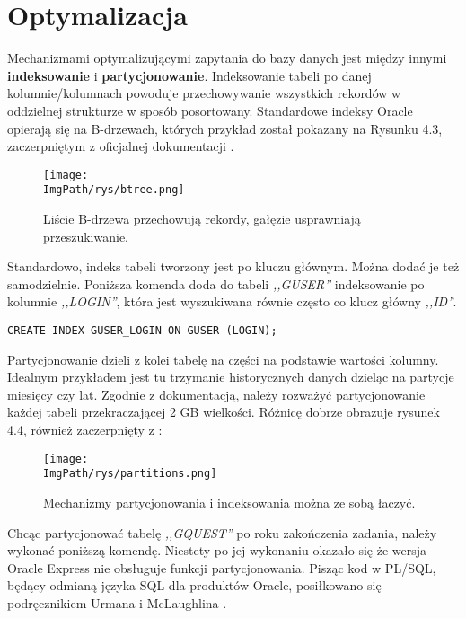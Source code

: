\documentclass[a4paper,12pt,twoside,openany]{report}
\newcommand{\ImgPath}{.}
\begin{document}
\section{Optymalizacja}
Mechanizmami optymalizującymi zapytania do bazy danych jest między innymi \textbf{indeksowanie} i \textbf{partycjonowanie}. Indeksowanie tabeli po danej kolumnie/kolumnach powoduje przechowywanie wszystkich rekordów w oddzielnej strukturze w sposób posortowany. Standardowe indeksy Oracle opierają się na B-drzewach, których przykład został pokazany na Rysunku 4.3, zaczerpniętym z oficjalnej dokumentacji \cite{Oracle2}.
				\begin{figure}[!htbp]
					\begin{center}
						\centering
						\texttt{[image: \\ImgPath/rys/btree.png]}
					\end{center}
					\caption{Liście B-drzewa przechowują rekordy, gałęzie usprawniają przeszukiwanie.}
					\label{UMLTS}
				\end{figure}
Standardowo, indeks tabeli tworzony jest po kluczu głównym. Można dodać je też samodzielnie. Poniższa komenda doda do tabeli \textit{,,GUSER''} indeksowanie po kolumnie \textit{,,LOGIN''}, która jest wyszukiwana równie często co klucz główny \textit{,,ID'}'.
\begin{lstlisting}
CREATE INDEX GUSER_LOGIN ON GUSER (LOGIN);
\end{lstlisting}
Partycjonowanie dzieli z kolei tabelę na części na podstawie wartości kolumny. Idealnym przykładem jest tu trzymanie historycznych danych  dzieląc na partycje miesięcy czy lat. Zgodnie z dokumentacją, należy rozważyć partycjonowanie każdej tabeli przekraczającej 2 GB wielkości. Różnicę dobrze obrazuje rysunek 4.4, również zaczerpnięty z \cite{Oracle2}:
				\begin{figure}[!htbp]
					\begin{center}
						\centering
						\texttt{[image: \\ImgPath/rys/partitions.png]}
					\end{center}
					\caption{Mechanizmy partycjonowania i indeksowania można ze sobą łaczyć.}
					\label{UMLTS}
				\end{figure}
Chcąc partycjonować tabelę \textit{,,GQUEST''} po roku zakończenia zadania, należy wykonać poniższą komendę. Niestety po jej wykonaniu okazało się że wersja Oracle Express nie obsługuje funkcji partycjonowania. Pisząc kod w PL/SQL, będący odmianą języka SQL dla produktów Oracle, posiłkowano się podręcznikiem Urmana i McLaughlina \cite{Oracle}.\\\\
\end{document}
